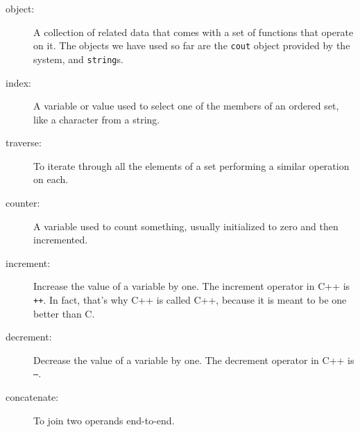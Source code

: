 \begin{description}

\item[object:] A collection of related data that comes with a set of
functions that operate on it.  The objects we have used so far are the
{\tt cout} object provided by the system, and {\tt string}s.

\item[index:]  A variable or value used to select one of the
members of an ordered set, like a character from a string.

\item[traverse:]  To iterate through all the elements of a set
performing a similar operation on each.

\item[counter:]  A variable used to count something, usually
initialized to zero and then incremented.

\item[increment:]  Increase the value of a variable by one.
The increment operator in C++ is {\tt ++}.  In fact, that's
why C++ is called C++, because it is meant to be one better
than C.

\item[decrement:]  Decrease the value of a variable by one.
The decrement operator in C++ is {\tt --}.

\item[concatenate:] To join two operands end-to-end.


\end{description}
